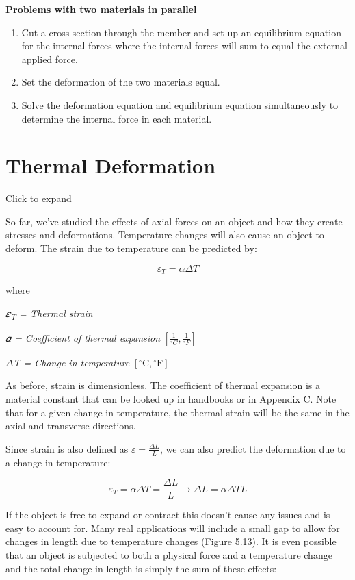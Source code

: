 \documentclass[
  letterpaper,
  DIV=11,
  numbers=noendperiod]{scrreprt}
\providecommand{\tightlist}{%
  \setlength{\itemsep}{0pt}\setlength{\parskip}{0pt}}\usepackage{longtable,booktabs,array}
\begin{document}
\begin{tcolorbox}
\textbf{Problems with two materials in parallel}

\begin{enumerate}
\def\labelenumi{\arabic{enumi}.}
\tightlist
\item
  Cut a cross-section through the member and set up an equilibrium
  equation for the internal forces where the internal forces will sum to
  equal the external applied force.
\item
  Set the deformation of the two materials equal.
\item
  Solve the deformation equation and equilibrium equation simultaneously
  to determine the internal force in each material.
\end{enumerate}

\end{tcolorbox}

\section{Thermal Deformation}\label{sec-5.6}

Click to expand

So far, we've studied the effects of axial forces on an object and how
they create stresses and deformations. Temperature changes will also
cause an object to deform. The strain due to temperature can be
predicted by:

\[
\varepsilon_T=\alpha \Delta T\]

where

\emph{𝜀\textsubscript{T} = Thermal strain}

\emph{𝛼 = Coefficient of thermal expansion}
\(\left[\frac{1}{{ }^{\circ} C}, \frac{1}{{ }^{\circ} F}\right]\)

\emph{ΔT = Change in temperature}
\(\left[{ }^{\circ} \mathrm{C},{ }^{\circ} \mathrm{F}\right]\)

As before, strain is dimensionless. The coefficient of thermal expansion
is a material constant that can be looked up in handbooks or in Appendix
C. Note that for a given change in temperature, the thermal strain will
be the same in the axial and transverse directions.

Since strain is also defined as \(\varepsilon=\frac{\Delta L}{L}\), we
can also predict the deformation due to a change in temperature:

\[
\varepsilon_T=\alpha \Delta T=\frac{\Delta L}{L} \rightarrow \Delta L=\alpha \Delta T L\]

If the object is free to expand or contract this doesn't cause any
issues and is easy to account for. Many real applications will include a
small gap to allow for changes in length due to temperature changes
(Figure 5.13). It is even possible that an object is subjected to both a
physical force and a temperature change and the total change in length
is simply the sum of these effects:
\end{document}
